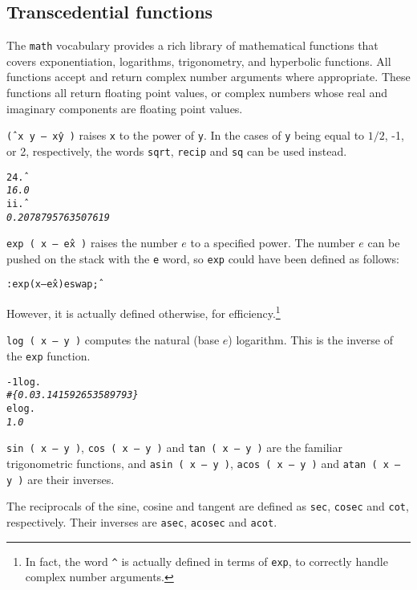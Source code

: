 \documentclass[english]{article}
\begin{document}
\subsection{Transcedential functions}

The \texttt{math} vocabulary provides a rich library of mathematical functions that covers exponentiation, logarithms, trigonometry, and hyperbolic functions. All functions accept and return complex number arguments where appropriate. These functions all return floating point values, or complex numbers whose real and imaginary components are floating point values.

\texttt{\^ ( x y -- x\^y )} raises \texttt{x} to the power of \texttt{y}. In the cases of \texttt{y} being equal to $1/2$, -1, or 2, respectively, the words \texttt{sqrt}, \texttt{recip} and \texttt{sq} can be used instead.

\begin{alltt}
2 4 \^ .
\emph{16.0}
i i \^ .
\emph{0.2078795763507619}
\end{alltt}

\texttt{exp ( x -- e\^x )} raises the number $e$ to a specified power. The number $e$ can be pushed on the stack with the \texttt{e} word, so \texttt{exp} could have been defined as follows:

\begin{alltt}
: exp ( x -- e\^x ) e swap \^ ;
\end{alltt}

However, it is actually defined otherwise, for efficiency.\footnote{In fact, the word \texttt{\^} is actually defined in terms of \texttt{exp}, to correctly handle complex number arguments.}

\texttt{log ( x -- y )} computes the natural (base $e$) logarithm. This is the inverse of the \texttt{exp} function.

\begin{alltt}
-1 log .
\emph{\#\{ 0.0 3.141592653589793 \}}
e log .
\emph{1.0}
\end{alltt}

\texttt{sin ( x -- y )}, \texttt{cos ( x -- y )} and \texttt{tan ( x -- y )} are the familiar trigonometric functions, and \texttt{asin ( x -- y )}, \texttt{acos ( x -- y )} and \texttt{atan ( x -- y )} are their inverses.

The reciprocals of the sine, cosine and tangent are defined as \texttt{sec}, \texttt{cosec} and \texttt{cot}, respectively. Their inverses are \texttt{asec}, \texttt{acosec} and \texttt{acot}.
\end{document}
